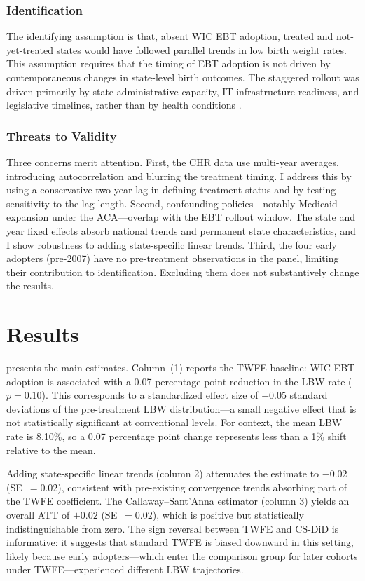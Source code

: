 \documentclass[12pt]{article}
\begin{document}
\subsubsection*{Identification} The identifying assumption is that, absent WIC EBT adoption, treated and not-yet-treated states would have followed parallel trends in low birth weight rates. This assumption requires that the timing of EBT adoption is not driven by contemporaneous changes in state-level birth outcomes. The staggered rollout was driven primarily by state administrative capacity, IT infrastructure readiness, and legislative timelines, rather than by health conditions \citep{meckel2020}.

\subsubsection*{Threats to Validity} Three concerns merit attention. First, the CHR data use multi-year averages, introducing autocorrelation and blurring the treatment timing. I address this by using a conservative two-year lag in defining treatment status and by testing sensitivity to the lag length. Second, confounding policies---notably Medicaid expansion under the ACA---overlap with the EBT rollout window. The state and year fixed effects absorb national trends and permanent state characteristics, and I show robustness to adding state-specific linear trends. Third, the four early adopters (pre-2007) have no pre-treatment observations in the panel, limiting their contribution to identification. Excluding them does not substantively change the results.

\section{Results}



 presents the main estimates. Column~(1) reports the TWFE baseline: WIC EBT adoption is associated with a 0.07 percentage point reduction in the LBW rate ($p=0.10$). This corresponds to a standardized effect size of $-0.05$ standard deviations of the pre-treatment LBW distribution---a small negative effect that is not statistically significant at conventional levels. For context, the mean LBW rate is 8.10\%, so a 0.07 percentage point change represents less than a 1\% shift relative to the mean.

Adding state-specific linear trends (column 2) attenuates the estimate to $-0.02$ (SE~$=0.02$), consistent with pre-existing convergence trends absorbing part of the TWFE coefficient. The Callaway--Sant'Anna estimator (column 3) yields an overall ATT of $+0.02$ (SE~$=0.02$), which is positive but statistically indistinguishable from zero. The sign reversal between TWFE and CS-DiD is informative: it suggests that standard TWFE is biased downward in this setting, likely because early adopters---which enter the comparison group for later cohorts under TWFE---experienced different LBW trajectories.
\end{document}
